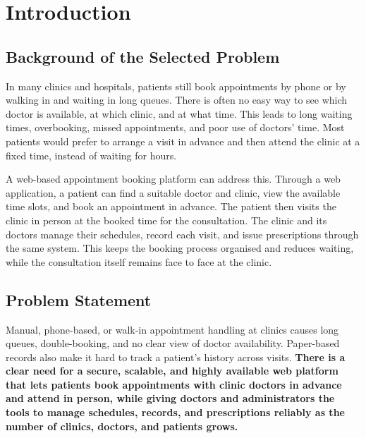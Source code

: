 \documentclass[12pt,a4paper]{article}
\begin{document}
\section{Introduction}

\subsection{Background of the Selected Problem}
In many clinics and hospitals, patients still book appointments by phone or by walking in and
waiting in long queues. There is often no easy way to see which doctor is available, at which
clinic, and at what time. This leads to long waiting times, overbooking, missed appointments,
and poor use of doctors' time. Most patients would prefer to arrange a visit in advance and
then attend the clinic at a fixed time, instead of waiting for hours.

A web-based appointment booking platform can address this. Through a web application, a patient
can find a suitable doctor and clinic, view the available time slots, and book an appointment in
advance. The patient then visits the clinic in person at the booked time for the consultation.
The clinic and its doctors manage their schedules, record each visit, and issue prescriptions
through the same system. This keeps the booking process organised and reduces waiting, while the
consultation itself remains face to face at the clinic.

\subsection{Problem Statement}
Manual, phone-based, or walk-in appointment handling at clinics causes long queues,
double-booking, and no clear view of doctor availability. Paper-based records also make it hard
to track a patient's history across visits. \textbf{There is a clear need for a secure,
scalable, and highly available web platform that lets patients book appointments with clinic
doctors in advance and attend in person, while giving doctors and administrators the tools to
manage schedules, records, and prescriptions reliably as the number of clinics, doctors, and
patients grows.}
\end{document}
